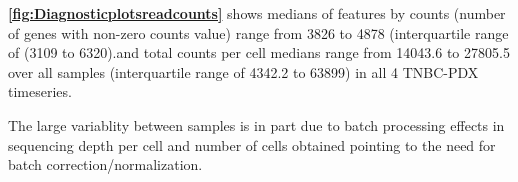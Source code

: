 \textbf{\autoref{fig:Diagnosticplotsreadcounts}} shows medians of features by counts (number of genes with non-zero counts value) range from 3826 to 4878 (interquartile range of (3109 to 6320).and total counts per cell medians range from 14043.6 to 27805.5 over all samples (interquartile range of 4342.2 to 63899) in all 4 TNBC-PDX timeseries. 



The large variablity between samples is in part due to batch processing effects in sequencing depth per cell and number of cells obtained pointing to the need for batch correction/normalization.




